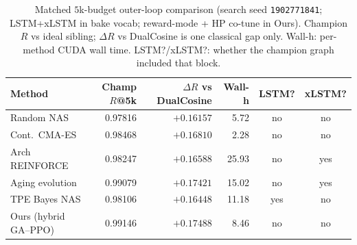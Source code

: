 \begin{table}[t]
  \centering
  \caption{Matched $5$k-budget outer-loop comparison (search seed \texttt{1902771841}; LSTM+xLSTM in bake vocab; reward-mode + HP co-tune in Ours). Champion $R$ vs ideal sibling; $\Delta R$ vs DualCosine is one classical gap only. Wall-h: per-method CUDA wall time. LSTM?/xLSTM?: whether the champion graph included that block.}
  \label{tab:meta-approaches}
  \setlength{\tabcolsep}{3pt}
  \small
  \begin{tabular}{@{}lrrrcc@{}}
    \toprule
    Method & Champ $R$@5k & $\Delta R$ vs DualCosine & Wall-h & LSTM? & xLSTM? \\
    \midrule
    Random NAS & 0.97816 & $+0.16157$ & 5.72 & no & no \\
    Cont.\ CMA-ES & 0.98468 & $+0.16810$ & 2.28 & no & no \\
    Arch REINFORCE & 0.98247 & $+0.16588$ & 25.93 & no & yes \\
    Aging evolution & 0.99079 & $+0.17421$ & 15.02 & no & yes \\
    TPE Bayes NAS & 0.98106 & $+0.16448$ & 11.18 & yes & no \\
    Ours (hybrid GA--PPO) & 0.99146 & $+0.17488$ & 8.46 & no & no \\
    \bottomrule
  \end{tabular}
\end{table}
